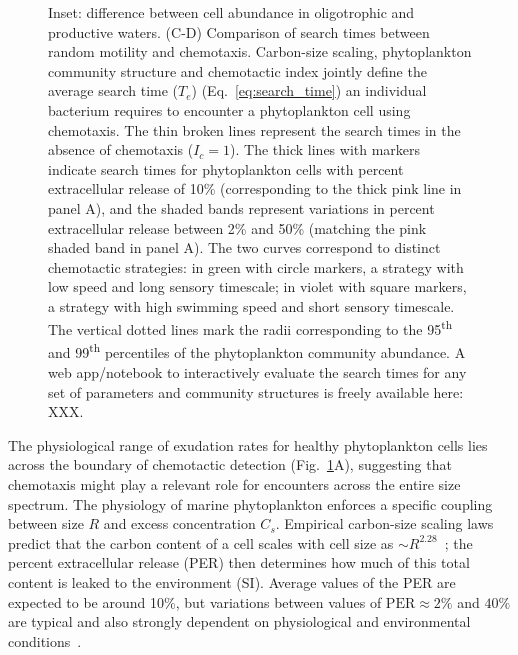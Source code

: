 \documentclass[9pt,twocolumn,twoside]{pnas-new}
\begin{document}
\begin{figure}
{        Inset: difference between cell abundance in oligotrophic and productive waters.
        (C-D) Comparison of search times between random motility and chemotaxis.
        Carbon-size scaling, phytoplankton community structure and chemotactic index jointly define the average search time ($T_e$) (Eq.~\ref{eq:search_time}) an individual bacterium requires to encounter a phytoplankton cell using chemotaxis.
        The thin broken lines represent the search times in the absence of chemotaxis ($I_c=1$).
        The thick lines with markers indicate search times for phytoplankton cells with percent extracellular release of 10\% (corresponding to the thick pink line in panel A), and the shaded bands represent variations in percent extracellular release between 2\% and 50\% (matching the pink shaded band in panel A).
        The two curves correspond to distinct chemotactic strategies: in green with circle markers, a strategy with low speed and long sensory timescale; in violet with square markers, a strategy with high swimming speed and short sensory timescale.
        The vertical dotted lines mark the radii corresponding to the 95\textsuperscript{th} and 99\textsuperscript{th} percentiles of the phytoplankton community abundance.
        {\color{magenta}A web app/notebook to interactively evaluate the search times for any set of parameters and community structures is freely available here: XXX.}
    }
    \label{fig:ecology}
\end{figure}



The physiological range of exudation rates for healthy phytoplankton cells lies across the boundary of chemotactic detection (Fig.~\ref{fig:ecology}A), suggesting that chemotaxis might play a relevant role for encounters across the entire size spectrum. The physiology of marine phytoplankton enforces a specific coupling between size $R$ and excess concentration $C_s$.
Empirical carbon-size scaling laws predict that the carbon content of a cell scales with cell size as $\sim R^{2.28}$~\cite{mullin1966relationship}; the percent extracellular release (PER) then determines how much of this total content is leaked to the environment (SI).
Average values of the PER are expected to be around 10\%, but variations between values of $\mathrm{PER}\approx 2\%$ and $40\%$ are typical and also strongly dependent on physiological and environmental conditions~\cite{maranon2004significance}.
\end{document}
